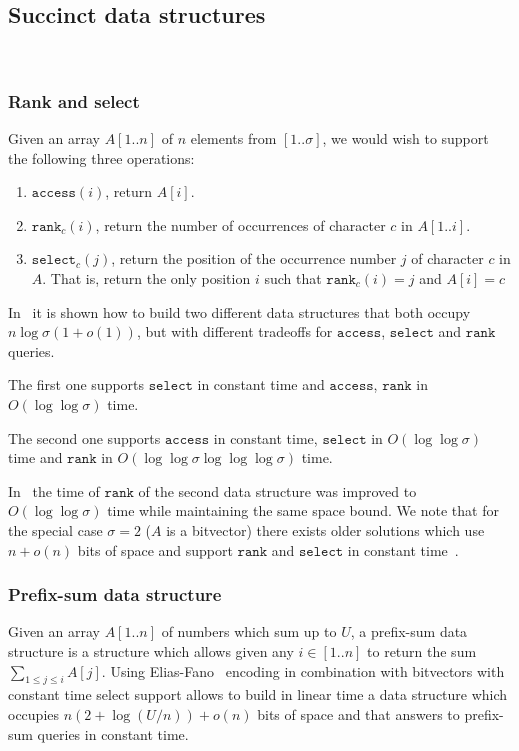 \documentclass[a4paper]{article}
\begin{document}
\subsection{Succinct data structures}
~\label{sec:succ_DS}
\subsubsection{Rank and select}
Given an array $A[1..n]$ of $n$ elements from $[1..\sigma]$, we would wish to support the following three operations: 
\begin{enumerate}
\item $\mathtt{access}(i)$, return $A[i]$. 
\item $\mathtt{rank}_c(i)$, return the number of occurrences of character $c$ in $A[1..i]$. 
\item $\mathtt{select}_c(j)$, return the position of the occurrence number $j$ of character $c$ in $A$. That 
is, return the only position $i$ such that $\mathtt{rank}_c(i)=j$ and $A[i]=c$
\end{enumerate}
In~\cite{GMR06} it is shown how to build two different data structures that both occupy $n\log\sigma(1+o(1))$, 
but with different tradeoffs for $\mathtt{access}$, $\mathtt{select}$ and $\mathtt{rank}$ queries.

The first one supports $\mathtt{select}$ in constant time and $\mathtt{access}$, $\mathtt{rank}$ in $O(\log\log\sigma)$ time. 

The second one supports $\mathtt{access}$ in constant time, $\mathtt{select}$ in $O(\log\log\sigma)$ time 
and $\mathtt{rank}$ in $O(\log\log\sigma\log\log\log\sigma)$ time. 

In~\cite{GOR10} the time of $\mathtt{rank}$ of the second data structure was improved to
$O(\log\log\sigma)$ time while maintaining the same space bound. 
We note that for the special case $\sigma=2$ ($A$ is a bitvector) there exists older solutions which use $n+o(n)$ bits of space 
and support $\mathtt{rank}$ and $\mathtt{select}$ in constant time~\cite{Cl96,Mun96}. 

\subsubsection{Prefix-sum data structure}
Given an array $A[1..n]$ of numbers which sum up to $U$, a prefix-sum 
data structure is a structure which allows given any $i\in[1..n]$ 
to return the sum $\sum_{1\leq j\leq i}A[j]$. 
Using Elias-Fano~\cite{El74,Fa71} encoding in combination with bitvectors with constant time select support allows
to build in linear time a data structure which occupies $n(2+\log(U/n))+o(n)$ bits of space and that 
answers to prefix-sum queries in constant time. 
\end{document}
